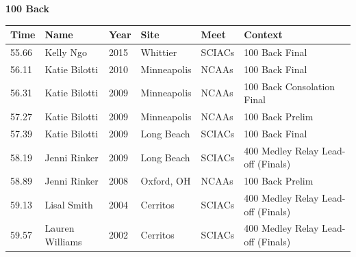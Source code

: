 \noindent\begin{minipage}[t]{0.98\textwidth}
\centering
\textbf{\textcolor{teamprimary}{100 Back}}\par
\vspace{0.5em}
\centering
\small
\renewcommand{\arraystretch}{1.0}
\setlength{\tabcolsep}{4pt}
\begin{tabular}{@{}p{2.0cm}p{3.2cm}p{1.2cm}p{2.0cm}p{2.0cm}p{2.5cm}@{}}
\toprule
\textbf{Time} & \textbf{Name} & \textbf{Year} & \textbf{Site} & \textbf{Meet} & \textbf{Context} \\
\midrule
55.66 & Kelly Ngo & 2015 & Whittier & SCIACs & 100 Back Final \\
56.11 & Katie Bilotti & 2010 & Minneapolis & NCAAs & 100 Back Final \\
56.31 & Katie Bilotti & 2009 & Minneapolis & NCAAs & 100 Back Consolation Final \\
57.27 & Katie Bilotti & 2009 & Minneapolis & NCAAs & 100 Back Prelim \\
57.39 & Katie Bilotti & 2009 & Long Beach & SCIACs & 100 Back Final \\
58.19 & Jenni Rinker & 2009 & Long Beach & SCIACs & 400 Medley Relay Lead-off (Finals) \\
58.89 & Jenni Rinker & 2008 & Oxford, OH & NCAAs & 100 Back Prelim \\
59.13 & Lisal Smith & 2004 & Cerritos & SCIACs & 400 Medley Relay Lead-off (Finals) \\
59.57 & Lauren Williams & 2002 & Cerritos & SCIACs & 400 Medley Relay Lead-off (Finals) \\
\bottomrule
\end{tabular}
\end{minipage}
\vspace{1.2em}
